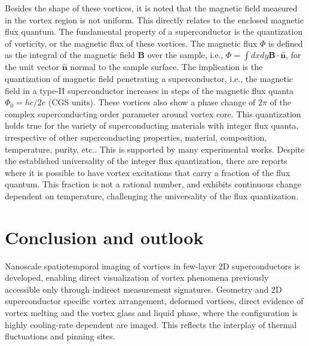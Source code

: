 Besides the shape of these vortices, it is noted that the magnetic field measured in the vortex region is not uniform. This directly relates to the enclosed magnetic flux quantum. The fundamental property of a superconductor is the quantization of vorticity\cite{onsagerStatisticalHydrodynamics1949,londonProblemMolecularTheory1948,abrikosovMagneticPropertiesSuperconductors1957}, or the magnetic flux of these vortices. The magnetic flux $\Phi$ is defined as the integral of the magnetic field $\mathbf{B}$ over the sample, i.e., $\Phi = \int dxdy \mathbf{B} \cdot \hat{\mathbf{n}}$, for the unit vector $\hat{\mathbf{n}}$ normal to the sample surface. The implication is the quantization of magnetic field penetrating a superconductor, i.e., the magnetic field in a type-II superconductor increases in steps of the magnetic flux quanta $\Phi_0 = hc/2e$ (CGS units)\cite{abrikosovMagneticPropertiesSuperconductors1957}. These vortices also show a phase change of $2\pi$ of the complex superconducting order parameter around vortex core. This quantization holds true for the variety of superconducting materials with integer flux quanta, irrespective of other superconducting properties, material, composition, temperature, purity, etc.\cite{iguchiSuperconductingVorticesCarrying2023}. This is supported by many experimental works\cite{changScanningHallProbe1992,hessScanningtunnelingmicroscopyStudyDistortion1992,schlusselWideFieldImagingSuperconductor2018}. Despite the established universality of the integer flux quantization, there are reports where it is possible to have vortex excitations that carry a fraction of the flux quantum. This fraction is not a rational number, and exhibits continuous change dependent on temperature, challenging the universality of the flux quantization\cite{iguchiSuperconductingVorticesCarrying2023}.

\section*{Conclusion and outlook}

Nanoscale spatiotemporal imaging of vortices in few-layer 2D superconductors is developed, enabling direct visualization of vortex phenomena previously accessible only through indirect measurement signatures. Geometry and 2D superconductor specific vortex arrangement, deformed vortices, direct evidence of vortex melting and the vortex glass and liquid phase, where the configuration is highly cooling-rate dependent are imaged. This reflects the interplay of thermal fluctuations and pinning sites. 

